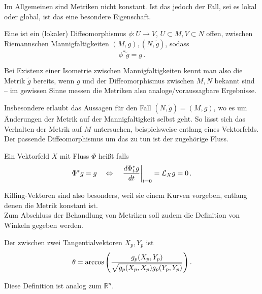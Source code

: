 Im Allgemeinen sind Metriken nicht konstant. Ist das jedoch der Fall, sei es lokal oder global, ist das eine besondere Eigenschaft.

\begin{defi}[Isometrie]
Eine  ist ein (lokaler) Diffeomorphismus $\phi: U \rightarrow V$, $U \subset M, V \subset N$ offen, zwischen Riemannschen Mannigfaltigkeiten $(M, g), (N, \tilde{g})$, sodass
\begin{equation}
\phi^* \tilde{g} = g \, .
\end{equation}
\end{defi}

Bei Existenz einer Isometrie zwischen Mannigfaltigkeiten kennt man also die Metrik $\tilde{g}$ bereits, wenn $g$ und der Diffeomorphismus zwischen $M, N$ bekannt sind -- im gewissen Sinne messen die Metriken also analoge/voraussagbare Ergebnisse.


Insbesondere erlaubt das Aussagen für den Fall $(N, \tilde{g}) = (M, g)$, wo es um Änderungen der Metrik auf der Mannigfaltigkeit selbst geht. So lässt sich das Verhalten der Metrik auf $M$ untersuchen, beispielsweise entlang eines Vektorfelds. Der passende Diffeomorphismus um das zu tun ist der zugehörige Fluss.

\begin{defi}
Ein Vektorfeld $X$ mit Fluss $\Phi$ heißt  falls
\begin{equation}
\Phi^* g = g \quad \Leftrightarrow \quad \eval{\dv{\Phi_t^* g}{t}}_{t = 0} = \mathcal{L}_X g = 0 \, .
\end{equation}
\end{defi}

Killing-Vektoren sind also besonders, weil sie einem Kurven vorgeben, entlang denen die Metrik konstant ist.\\



Zum Abschluss der Behandlung von Metriken soll zudem die Definition von Winkeln gegeben werden.
\begin{defi}[Winkel]
Der  zwischen zwei Tangentialvektoren $X_p, Y_p$ ist
\begin{equation}
\theta = \arccos\qty(\frac{g_p(X_p, Y_p)}{\sqrt{g_p(X_p, X_p) g_p(Y_p, Y_p)}}) \, .
\end{equation}
\end{defi}

Diese Definition ist analog zum $\mathbb{R}^n$.



